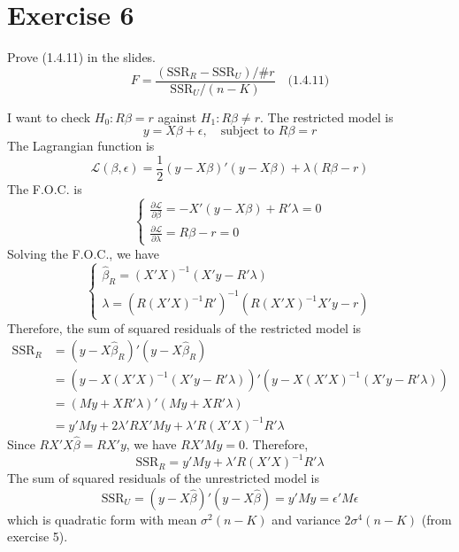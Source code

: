 \documentclass[12pt, letterpaper, onecolumn]{exam}
\begin{document}
\section*{Exercise 6}
Prove (1.4.11) in the slides.
\[
    F = \frac{(\text{SSR}_{R}- \text{SSR}_{U})/\#r}{\text{SSR}_{U}/(n - K)}\quad
    \text{(1.4.11)}
\]

\begin{solution}
    I want to check $H_{0}: R\beta = r$ against $H_{1}: R\beta \neq r$. The
    restricted model is
    \[
        y = X\beta + \epsilon, \quad \text{subject to }R\beta = r
    \]
    The Lagrangian function is
    \[
        \mathcal{L}(\beta, \epsilon) = \frac{1}{2}(y - X\beta)'(y - X\beta) +
        \lambda (R\beta - r)
    \]
    The F.O.C. is
    \[
        \begin{cases}
            \frac{\partial \mathcal{L}}{\partial \beta} = -X'(y - X\beta) + R'\lambda = 0 \\
            \frac{\partial \mathcal{L}}{\partial \lambda} = R\beta - r = 0
        \end{cases}
    \]
    Solving the F.O.C., we have
    \[
        \begin{cases}
            \hat{\beta}_{R}= (X'X)^{-1}(X'y - R'\lambda) \\
            \lambda = (R(X'X)^{-1}R')^{-1}(R(X'X)^{-1}X'y - r)
        \end{cases}
    \]
    Therefore, the sum of squared residuals of the restricted model is
    \begin{align*}
        \text{SSR}_{R} & = (y - X\hat{\beta}_{R})'(y - X\hat{\beta}_{R})                         \\
                       & = (y - X(X'X)^{-1}(X'y - R'\lambda))'(y - X(X'X)^{-1}(X'y - R'\lambda)) \\
                       & = (My + XR'\lambda)'(My + XR'\lambda)                                   \\
                       & = y'My + 2\lambda'RX'My + \lambda'R(X'X)^{-1}R'\lambda
    \end{align*}
    Since $RX'X\hat{\beta}= RX'y$, we have $RX'My = 0$. Therefore,
    \[
        \text{SSR}_{R}= y'My + \lambda'R(X'X)^{-1}R'\lambda
    \]
    The sum of squared residuals of the unrestricted model is
    \[
        \text{SSR}_{U}= (y - X\hat{\beta})'(y - X\hat{\beta}) = y'My = \epsilon
        'M\epsilon
    \]
    which is quadratic form with mean $\sigma^{2}(n-K)$ and variance $2\sigma
        ^{4}(n-K)$ (from exercise 5).


\end{solution}
\end{document}
